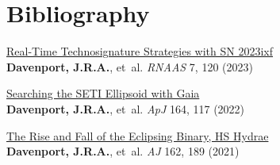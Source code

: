 
\section*{Bibliography}


\begin{etaremune}[leftmargin=10pt]


\item {\sc \href{https://doi.org/10.3847/2515-5172/acdc24}{\color{NavyBlue} Real-Time Technosignature Strategies with SN 2023ixf }}\\
{\bf Davenport, J.R.A.}, et~al. {\em RNAAS}  7, 120 (2023)




%
%


\item {\sc \href{https://arxiv.org/abs/2206.04092}{\color{NavyBlue}Searching the SETI Ellipsoid with Gaia}}\\
{\bf Davenport, J.R.A.}, et~al. {\em ApJ} 164, 117 (2022)



\item{\sc \href{https://arxiv.org/abs/2107.10954}{\color{NavyBlue}The Rise and Fall of the Eclipsing Binary, HS Hydrae}}\\
{\bf Davenport, J.R.A.}, et~al. {\em AJ} 162, 189 (2021)


\end{etaremune}
